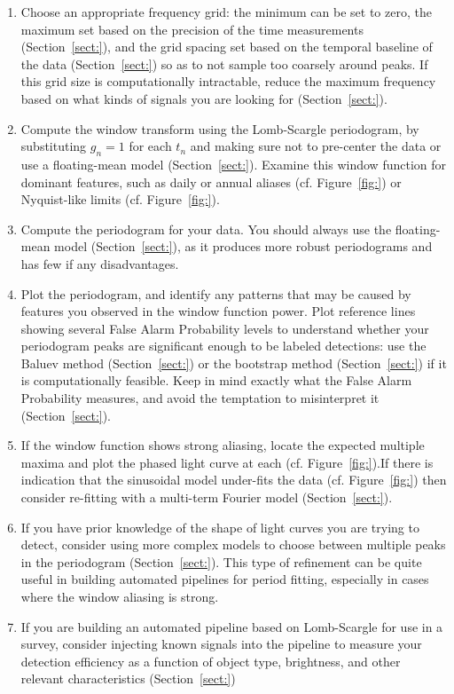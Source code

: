 \documentclass[preprint]{aastex}
\newcommand{\fig}[1]{Figure~\ref{fig:#1}}
\newcommand{\Sect}[1]{Section~\ref{sect:#1}}
\newcommand{\sect}[1]{\Sect{#1}}
\begin{document}
\begin{enumerate}
  \item Choose an appropriate frequency grid: the minimum can be set to zero,
    the maximum set based on the precision of the time measurements
    (\sect{}), and the grid spacing set based on the temporal baseline of
    the data (\sect{}) so as to not sample too coarsely around peaks.
    If this grid size is computationally intractable, reduce the maximum
    frequency based on what kinds of signals you are looking for (\sect{}).
  \item Compute the window transform using the Lomb-Scargle periodogram,
    by substituting $g_n=1$ for each $t_n$ and making sure not to pre-center
    the data or use a floating-mean model (\sect{}). Examine this window
    function for dominant features, such as daily or annual aliases (cf.
    \fig{}) or Nyquist-like limits (cf. \fig{}).
  \item Compute the periodogram for your data. You should always use the
    floating-mean model (\sect{}), as it produces more robust periodograms
    and has few if any disadvantages.
  \item Plot the periodogram, and identify any patterns that may be caused
    by features you observed in the window function power. Plot reference
    lines showing several False Alarm Probability levels to understand whether
    your periodogram peaks are significant enough to be labeled detections:
    use the Baluev method (\sect{})
    or the bootstrap method (\sect{}) 
    if it is computationally feasible.
    Keep in mind exactly what the False Alarm Probability measures, and
    avoid the temptation to misinterpret it (\sect{}).
  \item If the window function shows strong aliasing, locate the expected
    multiple maxima and plot the phased light curve at each
    (cf. \fig{}).If there is indication
    that the sinusoidal model under-fits the data (cf. \fig{}) then consider
    re-fitting with a multi-term Fourier model (\sect{}).
  \item If you have prior knowledge of the shape of light curves you are
    trying to detect, consider using more complex models to choose between
    multiple peaks in the periodogram (\sect{}). This type of refinement can
    be quite useful in building automated pipelines for period fitting,
    especially in cases where the window aliasing is strong.
  \item If you are building an automated pipeline based on Lomb-Scargle for
    use in a survey, consider injecting known signals into the pipeline to
    measure your detection efficiency as a function of object type, brightness,
    and other relevant characteristics (\sect{})
\end{enumerate}
\end{document}
